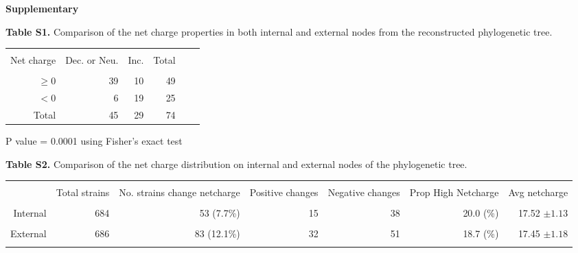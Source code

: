 \documentclass[12pt,a4paper]{article}
\begin{document}
{\bf Supplementary}
\clearpage

\begin{table}
{\bf Table S1.} Comparison of the net charge properties in both internal and external nodes from the reconstructed phylogenetic tree.

\begin{tabular*}{10cm}{rrrrrr}
\hline\hline \\%

Net charge&  Dec. or Neu. &  Inc. & Total  & \\
\hline \\ %
$ \geq 0$  &  39          &  10   & 49     &  \\
$ < 0$       &   6           &  19   & 25     &  \\
Total         &  45           &  29   & 74    &  \\
\hline %
\end{tabular*}
\end{table}
P value = 0.0001 using Fisher's exact test

\clearpage


\begin{table}
{\bf Table S2.} Comparison of the net charge distribution on internal and external nodes of the phylogenetic tree.

\begin{tabular*}{16cm}{rrrrrrr}
\hline\hline \\%
  & Total strains&  \parbox[c]{1.8 cm}{\raggedright No. strains change netcharge}  &    \parbox[c]{1.8cm}{\raggedright Positive changes} &   \parbox[c]{1.8cm}{\raggedright Negative changes} &     \parbox[c]{1.8cm}{\raggedright Prop High Netcharge}    &     \parbox[c]{1.8cm}{\raggedright Avg netcharge}   \\
\hline \\ %
Internal &  684 & 53 (7.7\%) &  15 &   38 & 20.0 (\%) & 17.52 $\pm 1.13$\\ \\
External &  686 & 83 (12.1\%) &  32 &   51 & 18.7 (\%)& 17.45 $\pm 1.18$\\ \\
\hline %
\end{tabular*}
\end{table}
\clearpage
\end{document}
